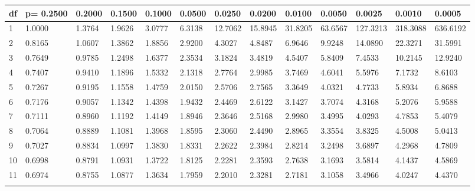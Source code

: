 {
 \fontsize{6pt}{6pt}
 \selectfont
\begin{tabular}{l|llllllllllll} 
df  & p= 0.2500  &  0.2000  &  0.1500  &  0.1000  &  0.0500  &  0.0250  &  0.0200  &  0.0100  &  0.0050  &  0.0025  &  0.0010  &  0.0005   \\\hline 
  1 & 1.0000 & 1.3764 & 1.9626 & 3.0777 & 6.3138 & 12.7062 & 15.8945 & 31.8205 & 63.6567 & 127.3213 & 318.3088 & 636.6192 \\[5pt] \arrayrulecolor{light-gray}\hline\arrayrulecolor{black}  
  2 & 0.8165 & 1.0607 & 1.3862 & 1.8856 & 2.9200 & 4.3027 & 4.8487 & 6.9646 & 9.9248 & 14.0890 & 22.3271 & 31.5991 \\[5pt] \arrayrulecolor{light-gray}\hline\arrayrulecolor{black}  
  3 & 0.7649 & 0.9785 & 1.2498 & 1.6377 & 2.3534 & 3.1824 & 3.4819 & 4.5407 & 5.8409 & 7.4533 & 10.2145 & 12.9240 \\[5pt] \arrayrulecolor{light-gray}\hline\arrayrulecolor{black}  
  4 & 0.7407 & 0.9410 & 1.1896 & 1.5332 & 2.1318 & 2.7764 & 2.9985 & 3.7469 & 4.6041 & 5.5976 & 7.1732 & 8.6103 \\[12pt] \arrayrulecolor{light-gray}\hline\arrayrulecolor{black}  
  5 & 0.7267 & 0.9195 & 1.1558 & 1.4759 & 2.0150 & 2.5706 & 2.7565 & 3.3649 & 4.0321 & 4.7733 & 5.8934 & 6.8688 \\[5pt] \arrayrulecolor{light-gray}\hline\arrayrulecolor{black}  
  6 & 0.7176 & 0.9057 & 1.1342 & 1.4398 & 1.9432 & 2.4469 & 2.6122 & 3.1427 & 3.7074 & 4.3168 & 5.2076 & 5.9588 \\[5pt] \arrayrulecolor{light-gray}\hline\arrayrulecolor{black}  
  7 & 0.7111 & 0.8960 & 1.1192 & 1.4149 & 1.8946 & 2.3646 & 2.5168 & 2.9980 & 3.4995 & 4.0293 & 4.7853 & 5.4079 \\[5pt] \arrayrulecolor{light-gray}\hline\arrayrulecolor{black}  
  8 & 0.7064 & 0.8889 & 1.1081 & 1.3968 & 1.8595 & 2.3060 & 2.4490 & 2.8965 & 3.3554 & 3.8325 & 4.5008 & 5.0413 \\[5pt] \arrayrulecolor{light-gray}\hline\arrayrulecolor{black}  
  9 & 0.7027 & 0.8834 & 1.0997 & 1.3830 & 1.8331 & 2.2622 & 2.3984 & 2.8214 & 3.2498 & 3.6897 & 4.2968 & 4.7809 \\[12pt] \arrayrulecolor{light-gray}\hline\arrayrulecolor{black}  
 10 & 0.6998 & 0.8791 & 1.0931 & 1.3722 & 1.8125 & 2.2281 & 2.3593 & 2.7638 & 3.1693 & 3.5814 & 4.1437 & 4.5869 \\[5pt] \arrayrulecolor{light-gray}\hline\arrayrulecolor{black}  
 11 & 0.6974 & 0.8755 & 1.0877 & 1.3634 & 1.7959 & 2.2010 & 2.3281 & 2.7181 & 3.1058 & 3.4966 & 4.0247 & 4.4370 \\[5pt] \arrayrulecolor{light-gray}\hline\arrayrulecolor{black}  

\end{tabular}}
